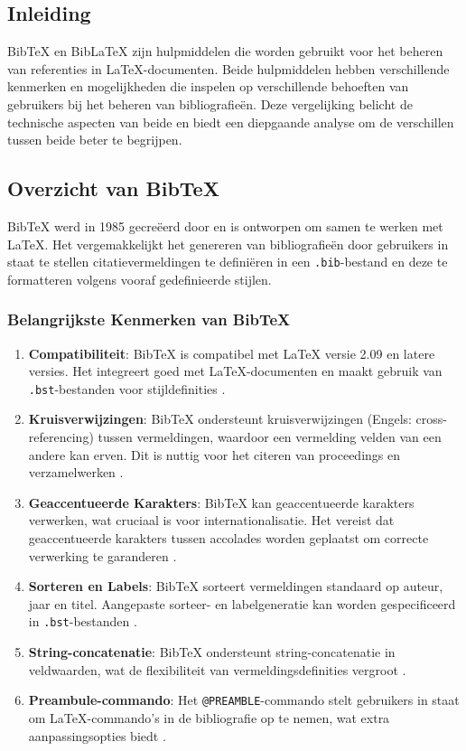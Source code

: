 \subsection{Inleiding}
BibTeX en BibLaTeX zijn hulpmiddelen die worden gebruikt voor het beheren van referenties in \LaTeX{}-documenten. Beide hulpmiddelen hebben verschillende kenmerken en mogelijkheden die inspelen op verschillende behoeften van gebruikers bij het beheren van bibliografieën. Deze vergelijking belicht de technische aspecten van beide en biedt een diepgaande analyse om de verschillen tussen beide beter te begrijpen.

\subsection{Overzicht van BibTeX}
BibTeX werd in 1985 gecreëerd door \textcite{Patashnik1988} en is ontworpen om samen te werken met \LaTeX{}. Het vergemakkelijkt het genereren van bibliografieën door gebruikers in staat te stellen citatievermeldingen te definiëren in een \texttt{.bib}-bestand en deze te formatteren volgens vooraf gedefinieerde stijlen.

\subsubsection{Belangrijkste Kenmerken van BibTeX}
\begin{enumerate}
    \item \textbf{Compatibiliteit}: BibTeX is compatibel met \LaTeX{} versie 2.09 en latere versies. Het integreert goed met \LaTeX{}-documenten en maakt gebruik van \texttt{.bst}-bestanden voor stijldefinities \autocite{Patashnik1988}.
    \item \textbf{Kruisverwijzingen}: BibTeX ondersteunt kruisverwijzingen (Engels: cross-referencing) tussen vermeldingen, waardoor een vermelding velden van een andere kan erven. Dit is nuttig voor het citeren van proceedings en verzamelwerken \autocite{Patashnik1988}.
    \item \textbf{Geaccentueerde Karakters}: BibTeX kan geaccentueerde karakters verwerken, wat cruciaal is voor internationalisatie. Het vereist dat geaccentueerde karakters tussen accolades worden geplaatst om correcte verwerking te garanderen \autocite{Patashnik1988}.
    \item \textbf{Sorteren en Labels}: BibTeX sorteert vermeldingen standaard op auteur, jaar en titel. Aangepaste sorteer- en labelgeneratie kan worden gespecificeerd in \texttt{.bst}-bestanden \autocite{Patashnik1988}.
    \item \textbf{String-concatenatie}: BibTeX ondersteunt string-concatenatie in veldwaarden, wat de flexibiliteit van vermeldingsdefinities vergroot \autocite{Patashnik1988}.
    \item \textbf{Preambule-commando}: Het \texttt{@PREAMBLE}-commando stelt gebruikers in staat om \LaTeX{}-commando's in de bibliografie op te nemen, wat extra aanpassingsopties biedt \autocite{Patashnik1988}.
\end{enumerate}


